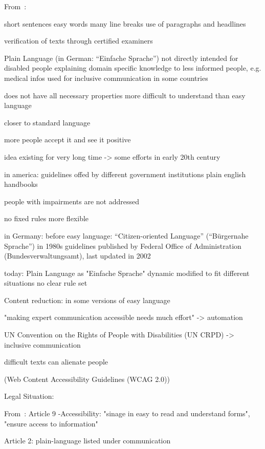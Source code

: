 From~\autocite{netzwerkLS}:

short sentences
easy words
many line breaks
use of paragraphs and headlines


verification of texts through certified examiners



Plain Language (in German: “Einfache Sprache”)
    not directly intended for disabled people
    explaining domain specific knowledge to less informed people, e.g. medical infos
    used for inclusive communication in some countries

    does not have all necessary properties
    more difficult to understand than easy language

    closer to standard language

    more people accept it and see it positive

    idea existing for very long time -> some efforts in early 20th century

    in america: guidelines offed by different government institutions
    plain english handbooks

    people with impairments are not addressed

    no fixed rules
    more flexible

    in Germany:
    before easy language: “Citizen-oriented Language” (“Bürgernahe Sprache”) in 1980s
    guidelines published by Federal Office of Administration (Bundesverwaltungsamt), last updated in 2002

    today: Plain Language as "Einfache Sprache"
    dynamic
    modified to fit different situations
    no clear rule set



Content reduction:
in some versions of easy language



"making expert communication accessible needs much effort" -> automation

UN Convention on the Rights of People with Disabilities (UN CRPD) -> inclusive communication

difficult texts can alienate people

(Web Content Accessibility Guidelines (WCAG 2.0))


Legal Situation:


From~\autocite{un2008}:
Article 9 -Accessibility: "sinage in easy to read and understand forms", "ensure access to information"

Article 2: plain-language listed under communication

